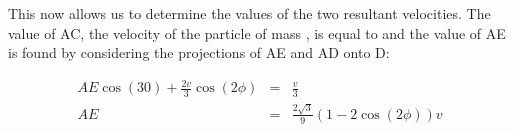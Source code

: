 \begin{problem}
{\begin{enumerate}
This now allows us to determine the values of the two resultant velocities. The value of AC, the velocity of the particle of mass , is equal to  and the value of AE is found by considering the projections of AE and AD onto D:

\begin{eqnarray*}
AE\cos{(30)}+\frac{2v}{3}\cos{(2\phi)} &=& \frac{v}{3} \\
AE &=& \frac{2\sqrt{3}}{9}(1-2\cos{(2\phi)})v
\end{eqnarray*}
\end{enumerate}
}
\end{problem}